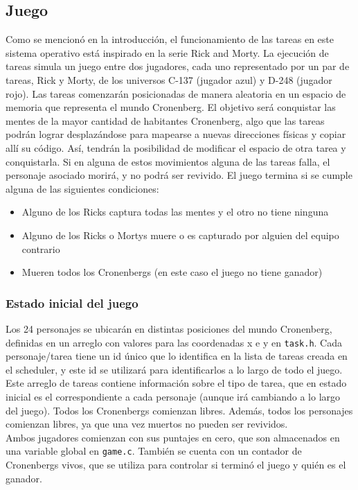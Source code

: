 \documentclass[a4paper]{article}
\begin{document}
\subsection{Juego}
Como se mencionó en la introducción, el funcionamiento de las tareas en este sistema operativo está inspirado en la serie Rick and Morty. La ejecución de tareas simula un juego entre dos jugadores, cada uno representado por un par de tareas, Rick y Morty, de los universos C-137 (jugador azul) y D-248 (jugador rojo). Las tareas comenzarán posicionadas de manera aleatoria en un espacio de memoria que representa el mundo Cronenberg. El objetivo será conquistar las mentes de la mayor cantidad de habitantes Cronenberg, algo que las tareas podrán lograr desplazándose para mapearse a nuevas direcciones físicas y copiar allí su código. Así, tendrán la posibilidad de modificar el espacio de otra tarea y conquistarla. Si en alguna de estos movimientos alguna de las tareas falla, el personaje asociado morirá, y no podrá ser revivido.
El juego termina si se cumple alguna de las siguientes condiciones:
\begin{itemize}
\item Alguno de los Ricks captura todas las mentes y el otro no tiene ninguna
\item Alguno de los Ricks o Mortys muere o es capturado por alguien del equipo contrario
\item Mueren todos los Cronenbergs (en este caso el juego no tiene ganador)
\end{itemize}

\subsubsection{Estado inicial del juego}
Los 24 personajes se ubicarán en distintas posiciones del mundo Cronenberg, definidas en un arreglo con valores para las coordenadas x e y en {\tt task.h}. Cada personaje/tarea tiene un id único que lo identifica en la lista de tareas creada en el scheduler, y este id se utilizará para identificarlos a lo largo de todo el juego. \\
Este arreglo de tareas contiene información sobre el tipo de tarea, que en estado inicial es el correspondiente a cada personaje (aunque irá cambiando a lo largo del juego). Todos los Cronenbergs comienzan libres. Además, todos los personajes comienzan libres, ya que una vez muertos no pueden ser revividos. \\
Ambos jugadores comienzan con sus puntajes en cero, que son almacenados en una variable global en {\tt game.c}. También se cuenta con un contador de Cronenbergs vivos, que se utiliza para controlar si terminó el juego y quién es el ganador.
\end{document}
